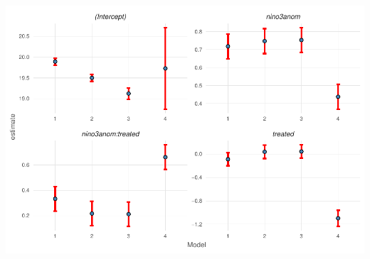 \documentclass[]{article}
\begin{document}
\includegraphics{Oremus_Villasenor-Derbez_files/figure-latex/unnamed-chunk-12-1.pdf}

\clearpage

\renewcommand\refname{References}

\end{document}
